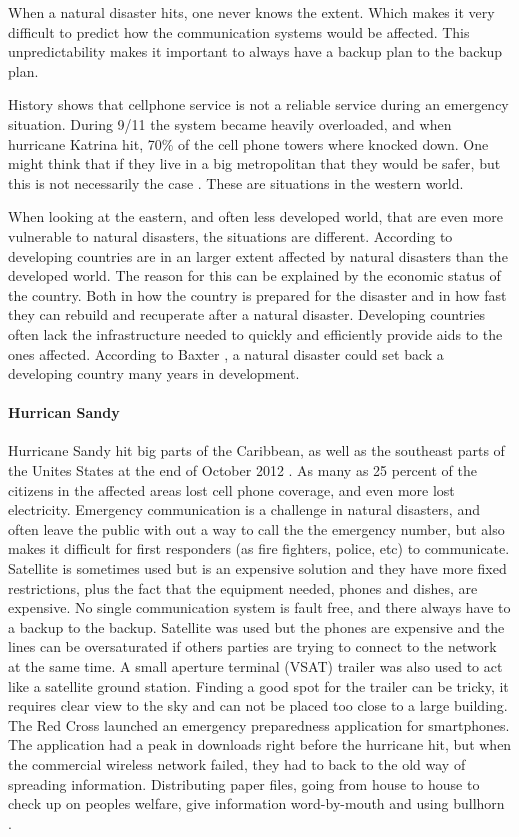 When a natural disaster hits, one never knows the extent. Which makes it very difficult to predict how the communication systems would be affected. This unpredictability makes it important to always have a backup plan to the backup plan. 

History shows that cellphone service is not a reliable service during an emergency situation. During 9/11 the system became heavily overloaded, and when hurricane Katrina hit, 70\% of the cell phone towers where knocked down. One might think that if they live in a big metropolitan that they would be safer, but this is not necessarily the case \cite{disasterComm}. These are situations in the western world. 

When looking at the eastern, and often less developed world, that are even more vulnerable to natural disasters, the situations are different. According to \cite{DevelopingWorld, 360} developing countries are in an larger extent affected by natural disasters than the developed world. The reason for this can be explained by the economic status of the country. Both in how the country is prepared for the disaster and in how fast they can rebuild and recuperate after a natural disaster. Developing countries often lack the infrastructure needed to quickly and efficiently provide aids to the ones affected. According to Baxter \cite{360} , a natural disaster could set back a developing country many years in development.  

\paragraph{Hurrican Sandy}
Hurricane Sandy hit big parts of the Caribbean, as well as the southeast parts of the Unites States at the end of October 2012 \cite{WikiSandy}. As many as 25 percent of the citizens in the affected areas lost cell phone coverage, and even more lost electricity. Emergency communication is a challenge in natural disasters, and often leave the public with out a way to call the the emergency number, but also makes it difficult for first responders (as fire fighters, police, etc) to communicate.  Satellite is sometimes used but is an expensive solution and they have more fixed restrictions, plus the fact that the equipment needed, phones and dishes, are expensive. No single communication system is fault free, and there always have to a backup to the backup. Satellite was used but the phones are expensive and the lines can be oversaturated if others parties are trying to connect to the network at the same time. A small aperture terminal (VSAT) trailer was also used to act like a satellite ground station. Finding a good spot for the trailer can be tricky, it requires clear view to the sky and can not be placed too close to a large building. The Red Cross launched an emergency preparedness application for smartphones. The application had a peak in downloads right before the hurricane hit, but when the commercial wireless network failed, they had to back to the old way of spreading information. Distributing paper files, going from house to house to check up on peoples welfare, give information word-by-mouth and using bullhorn \cite{hurricaneSandy}.

